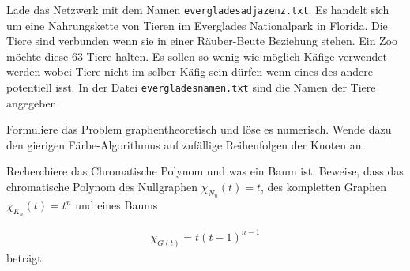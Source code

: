 \exercise[%
  topic=K\"afighaltung von Tieren,
    ]

Lade das Netzwerk mit dem Namen {\tt everglades\textunderscore adjazenz.txt}. Es handelt sich um eine Nahrungskette von Tieren im Everglades Nationalpark in Florida. Die Tiere sind verbunden wenn sie in einer R\"auber-Beute Beziehung stehen. Ein Zoo m\"ochte diese $63$ Tiere halten. Es sollen so wenig wie m\"oglich K\"afige verwendet werden wobei Tiere nicht im selber K\"afig sein d\"urfen wenn eines des andere potentiell isst. In der Datei {\tt everglades\textunderscore namen.txt} sind die Namen der Tiere angegeben.


Formuliere das Problem graphentheoretisch und l\"ose es numerisch. Wende dazu den gierigen F\"arbe-Algorithmus auf zuf\"allige Reihenfolgen der Knoten an. 

\exercise[%
  topic=Chromatisches Polynom,
    ]

Recherchiere das Chromatische Polynom und was ein Baum ist. Beweise, dass das chromatische Polynom des Nullgraphen $\chi_{N_n}(t) =t$, des kompletten Graphen $\chi_{K_n}(t) =t^n$ und eines Baums 

\begin{align}
\chi_{G(t)} = t(t-1)^{n-1}
\end{align}
betr\"agt.

 


	

